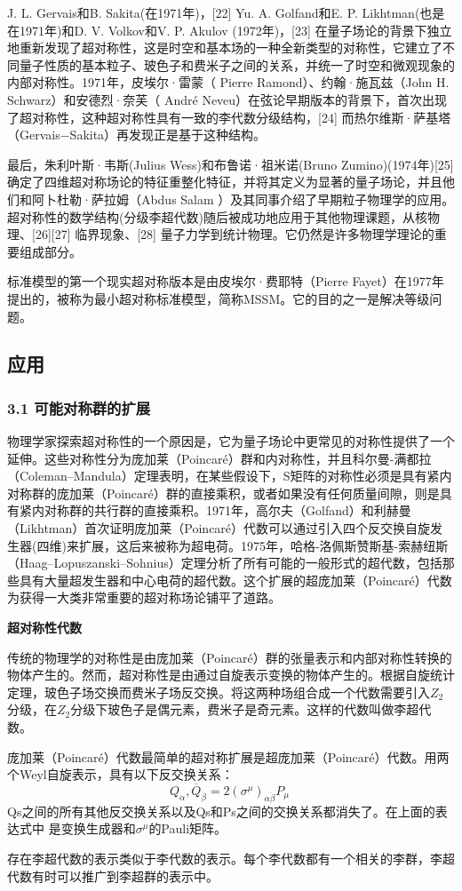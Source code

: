 J. L. Gervais和B. Sakita(在1971年)，[22] Yu. A. Golfand和E. P. Likhtman(也是在1971年)和D. V. Volkov和V. P. Akulov (1972年)，[23] 在量子场论的背景下独立地重新发现了超对称性，这是时空和基本场的一种全新类型的对称性，它建立了不同量子性质的基本粒子、玻色子和费米子之间的关系，并统一了时空和微观现象的内部对称性。1971年，皮埃尔·雷蒙（ Pierre Ramond）、约翰·施瓦兹（John H. Schwarz）和安德烈·奈芙（ André Neveu）在弦论早期版本的背景下，首次出现了超对称性，这种超对称性具有一致的李代数分级结构，[24] 而热尔维斯·萨基塔（Gervais−Sakita）再发现正是基于这种结构。

最后，朱利叶斯·韦斯(Julius Wess)和布鲁诺·祖米诺(Bruno Zumino)(1974年)[25] 确定了四维超对称场论的特征重整化特征，并将其定义为显著的量子场论，并且他们和阿卜杜勒·萨拉姆（Abdus Salam ）及其同事介绍了早期粒子物理学的应用。超对称性的数学结构(分级李超代数)随后被成功地应用于其他物理课题，从核物理、[26][27] 临界现象、[28] 量子力学到统计物理。它仍然是许多物理学理论的重要组成部分。

标准模型的第一个现实超对称版本是由皮埃尔·费耶特（Pierre Fayet）在1977年提出的，被称为最小超对称标准模型，简称MSSM。它的目的之一是解决等级问题。

\subsection{应用}
\subsubsection{3.1 可能对称群的扩展}
物理学家探索超对称性的一个原因是，它为量子场论中更常见的对称性提供了一个延伸。这些对称性分为庞加莱（Poincaré）群和内对称性，并且科尔曼-满都拉（Coleman–Mandula）定理表明，在某些假设下，S矩阵的对称性必须是具有紧内对称群的庞加莱（Poincaré）群的直接乘积，或者如果没有任何质量间隙，则是具有紧内对称群的共行群的直接乘积。1971年，高尔夫（Golfand）和利赫曼（Likhtman）首次证明庞加莱（Poincaré）代数可以通过引入四个反交换自旋发生器(四维)来扩展，这后来被称为超电荷。1975年，哈格-洛佩斯赞斯基-索赫纽斯（Haag–Lopuszanski–Sohnius）定理分析了所有可能的一般形式的超代数，包括那些具有大量超发生器和中心电荷的超代数。这个扩展的超庞加莱（Poincaré）代数为获得一大类非常重要的超对称场论铺平了道路。

\textbf{超对称性代数}

传统的物理学的对称性是由庞加莱（Poincaré）群的张量表示和内部对称性转换的物体产生的。然而，超对称性是由通过自旋表示变换的物体产生的。根据自旋统计定理，玻色子场交换而费米子场反交换。将这两种场组合成一个代数需要引入$Z_2$分级，在$Z_2$分级下玻色子是偶元素，费米子是奇元素。这样的代数叫做李超代数。

庞加莱（Poincaré）代数最简单的超对称扩展是超庞加莱（Poincaré）代数。用两个Weyl自旋表示，具有以下反交换关系：
$${Q_\alpha, \overline{Q}_{\dot{\beta}}} = 2 (\sigma^\mu)_{\alpha \dot{\beta}} P_\mu~$$
Qs之间的所有其他反交换关系以及Qs和Ps之间的交换关系都消失了。在上面的表达式中   是变换生成器和$\sigma^\mu$的Pauli矩阵。

存在李超代数的表示类似于李代数的表示。每个李代数都有一个相关的李群，李超代数有时可以推广到李超群的表示中。